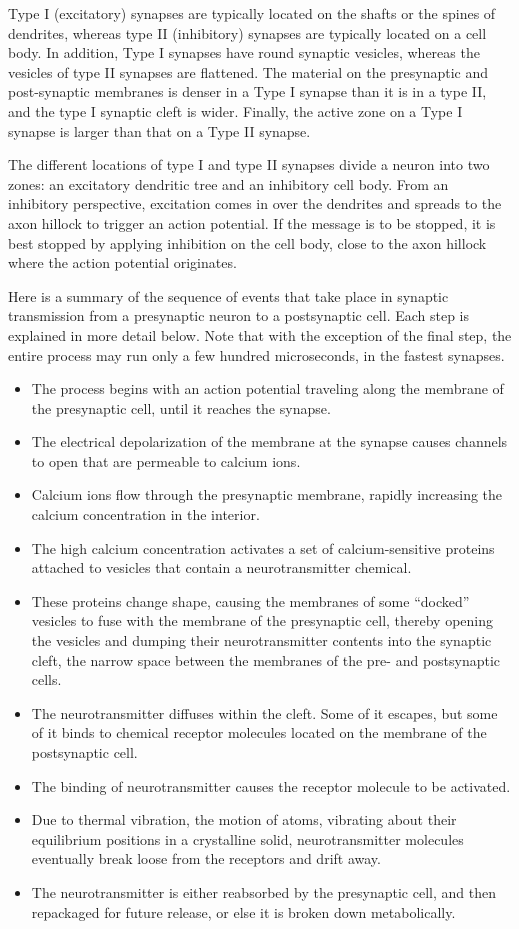 Type I (excitatory) synapses are typically located on the shafts or the spines of dendrites, whereas type II (inhibitory) synapses are typically located on a cell body. In addition, Type I synapses have round synaptic vesicles, whereas the vesicles of type II synapses are flattened. The material on the presynaptic and post-synaptic membranes is denser in a Type I synapse than it is in a type II, and the type I synaptic cleft is wider. Finally, the active zone on a Type I synapse is larger than that on a Type II synapse.

The different locations of type I and type II synapses divide a neuron into two zones: an excitatory dendritic tree and an inhibitory cell body. From an inhibitory perspective, excitation comes in over the dendrites and spreads to the axon hillock to trigger an action potential. If the message is to be stopped, it is best stopped by applying inhibition on the cell body, close to the axon hillock where the action potential originates.

Here is a summary of the sequence of events that take place in synaptic transmission from a presynaptic neuron to a postsynaptic cell. Each step is explained in more detail below. Note that with the exception of the final step, the entire process may run only a few hundred microseconds, in the fastest synapses.

\begin{itemize}
\tightlist
\item
  The process begins with an action potential traveling along the membrane of the presynaptic cell, until it reaches the synapse.
\item
  The electrical depolarization of the membrane at the synapse causes channels to open that are permeable to calcium ions.
\item
  Calcium ions flow through the presynaptic membrane, rapidly increasing the calcium concentration in the interior.
\item
  The high calcium concentration activates a set of calcium-sensitive proteins attached to vesicles that contain a neurotransmitter chemical.
\item
  These proteins change shape, causing the membranes of some ``docked'' vesicles to fuse with the membrane of the presynaptic cell, thereby opening the vesicles and dumping their neurotransmitter contents into the synaptic cleft, the narrow space between the membranes of the pre- and postsynaptic cells.
\item
  The neurotransmitter diffuses within the cleft. Some of it escapes, but some of it binds to chemical receptor molecules located on the membrane of the postsynaptic cell.
\item
  The binding of neurotransmitter causes the receptor molecule to be activated.
\item
  Due to thermal vibration, the motion of atoms, vibrating about their equilibrium positions in a crystalline solid, neurotransmitter molecules eventually break loose from the receptors and drift away.
\item
  The neurotransmitter is either reabsorbed by the presynaptic cell, and then repackaged for future release, or else it is broken down metabolically.
\end{itemize}

